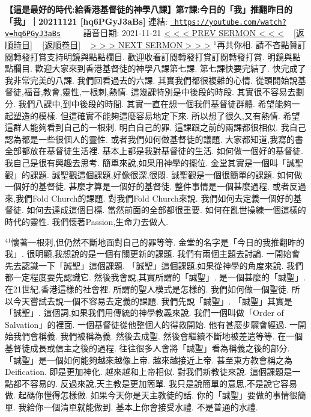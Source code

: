 \documentclass{book}
\begin{document}
\section{}
\label{sec:hq6PGyJ3aBs}
\textbf{【這是最好的時代:給香港基督徒的神學八課】第7課:今日的「我」推翻昨日的「我」｜20211121 [hq6PGyJ3aBs]}
\newline
\newline
連結: \href{https://youtube.com/watch?v=hq6PGyJ3aBs}{\texttt{ https://youtube.com/watch?v=hq6PGyJ3aBs}} ~~~~ 語音日期: 2021-11-21 
\newline
\newline
\hyperref[sec:BozY0a8wlNg]{\small{< < < PREV SERMON < < <}}
~
\hyperref[sec:index_chronic]{\small{[返順時目]}}
~
\hyperref[sec:index_scriptual]{\small{[返順卷目]}}
~
\hyperref[sec:gSBEvA3qrgQ]{\small{> > > NEXT SERMON > > >}}
\newline
\newline
$^{1}$再共你相.
請不吝點贊訂閱轉發打賞支持明鏡與點點欄目.
歡迎收看訂閱轉發打賞訂閱轉發打賞.
明鏡與點點欄目.
歡迎大家來到香港基督徒的神學八課第七課.
第七課快要完結了.
快完成了我非常完美的八課.
我們回看過去的六課.
其實我們都很複雜的心情.
從頭開始說基督徒,福音,教會,靈性,一根刺,熱情.
這幾課特別是中後段的時段.
其實很不容易去劃分.
我們八課中,到中後段的時間.
其實一直在想一個我們基督徒群體.
希望能夠一起塑造的模樣.
但這確實不能夠這麼容易地定下來.
所以想了很久,又有熱情.
希望這群人能夠看到自己的一根刺.
明白自己的罪.
這課跟之前的兩課都很相似.
我自己認為都是一些很個人的靈性.
或者我們如何做基督徒的議題.
大家都知道,我寫的書全部都放在基督徒生活裡.
基本上都是我對基督徒的生活.
如何做一個好的基督徒.
我自己是很有興趣去思考.
簡單來說,如果用神學的擺位.
金堂其實是一個叫「誠聖觀」的課題.
誠聖觀這個課題,好像很深,很悶.
誠聖觀是一個很簡單的課題.
如何做一個好的基督徒.
甚麼才算是一個好的基督徒.
整件事情是一個甚麼過程.
或者反過來,我們Fold Church的課題.
對我們Fold Church來說.
我們如何去定義一個好的基督徒.
如何去達成這個目標.
當然前面的全部都很重要.
如何在亂世操練一個這樣的時代的靈性.
我們懷著Passion,生命力去做人.

$^{41}$懷著一根刺,但仍然不斷地面對自己的罪等等.
金堂的名字是「今日的我推翻昨的我」.
很明顯,我想說的是一個有關更新的課題.
我們有兩個主題去討論.
一開始會先去認識一下「誠聖」這個課題.
「誠聖」這個課題,如果從神學的角度來說.
我們都一定程度要先認識它.
然後我會說,其實所謂的「誠聖」.
是一個甚麼的「誠聖」.
在21世紀,香港這樣的社會裡.
所謂的聖人模式是怎樣的.
我們如何做一個聖徒.
所以今天嘗試去說一個不容易去定義的課題.
我們先說「誠聖」.
「誠聖」其實是「誠聖」.
這個詞,如果我們用傳統的神學教義來說.
我們一個叫做「Order of Salvation」的裡面.
一個基督徒從他整個人的得救開始.
他有甚麼步驟會經過.
一開始我們會稱義.
我們被稱為義.
然後去成聖.
然後會繼續不斷地被差遣等等.
在一個基督徒成長或信主之後的過程.
往往很多人會將「誠聖」看為稱義之後的部分.
「誠聖」是一個如何能夠越來越像上帝.
越來越接近上帝.
甚至東方教會稱之為Deification.
即是更加神化.
越來越和上帝相似.
對我們新教徒來說.
這個課題是一點都不容易的.
反過來說,天主教是更加簡單.
我只是說簡單的意思,不是說它容易做.
起碼你懂得怎樣做.
如果今天你是天主教徒的話.
你的「誠聖」要做的事情很簡單.
我給你一個清單就能做到.
基本上你會接受水禮.
不是普通的水禮.
\end{document}
